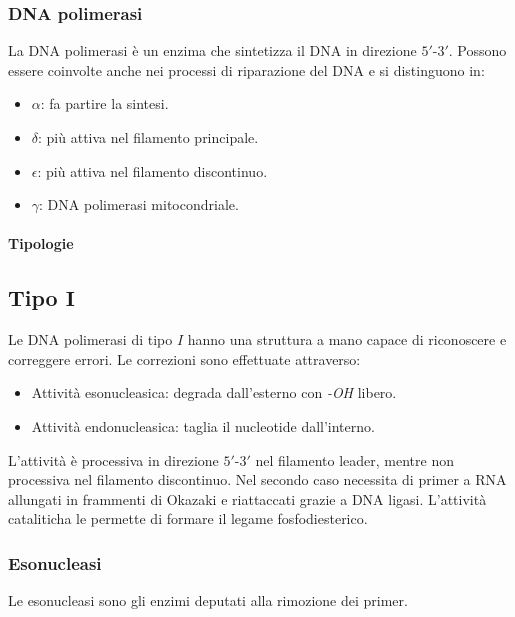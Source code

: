 		\subsubsection{DNA polimerasi}
		La DNA polimerasi \`e un enzima che sintetizza il DNA in direzione $5'$-$3'$.
		Possono essere coinvolte anche nei processi di riparazione del DNA e si distinguono in:
		\begin{multicols}{2}
			\begin{itemize}
				\item $\alpha$: fa partire la sintesi.
				\item $\delta$: pi\`u attiva nel filamento principale.
				\item $\epsilon$: pi\`u attiva nel filamento discontinuo.
				\item $\gamma$: DNA polimerasi mitocondriale.
			\end{itemize}
		\end{multicols}

			\paragraph{Tipologie}

				\subsection{Tipo $\mathbf{I}$}
				Le DNA polimerasi di tipo $I$ hanno una struttura a mano capace di riconoscere e correggere errori.
				Le correzioni sono effettuate attraverso:
				\begin{multicols}{2}
					\begin{itemize}
						\item Attivit\`a esonucleasica: degrada dall'esterno con \emph{-OH} libero.
						\item Attivit\`a endonucleasica: taglia il nucleotide dall'interno.
					\end{itemize}
				\end{multicols}
				L'attivit\`a \`e processiva in direzione $5'$-$3'$ nel filamento leader, mentre non processiva nel filamento discontinuo.
				Nel secondo caso necessita di primer a RNA allungati in frammenti di Okazaki e riattaccati grazie a DNA ligasi.
				L'attivit\`a cataliticha le permette di formare il legame fosfodiesterico.

		\subsubsection{Esonucleasi}
		Le esonucleasi sono gli enzimi deputati alla rimozione dei primer.
		
